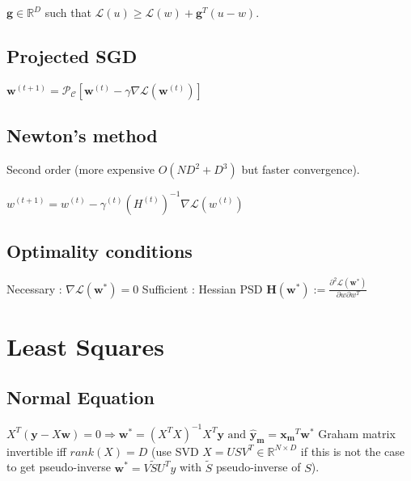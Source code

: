 $\mathbf{g} \in \mathbb{R}^D$ such that $\mathcal{L}(u) \ge \mathcal{L}(w) + \mathbf{g}^T (u-w)$. 


\subsection{Projected SGD}

$\mathbf{w}^{(t+1)} = \mathcal{P_C} [\mathbf{w}^{(t)} - \gamma \nabla \mathcal{L}(\mathbf{w}^{(t)})]$

\subsection{Newton's method}
Second order (more expensive $O(ND^2 + D^3)$ but faster convergence).

$w^{(t+1)} = w^{(t)} - \gamma^{(t)} (H^{(t)})^{-1} \nabla \mathcal{L}(w^{(t)})$


\subsection{Optimality conditions}
Necessary : $\nabla \mathcal{L} (\mathbf{w}^*) = 0$
Sufficient : Hessian PSD $\mathbf{H}(\mathbf{w}^*) := \frac{\partial^2 \mathcal{L}(\mathbf{w}^*)}{\partial w \partial w^T}$


\section{Least Squares}
\subsection{Normal Equation}
$X^T (\mathbf{y} - X\mathbf{w})= 0 \Rightarrow$\newline$\mathbf{w^*} = (X^TX)^{-1}X^T\mathbf{y} \text{ and } \mathbf{\hat{y}_m} = \mathbf{x_m}^T \mathbf{w^*}$
Graham matrix invertible iff $rank(X) = D$ (use SVD $X = USV^T \in \mathbb{R}^{N\times D}$ if this is not the case to get pseudo-inverse $\mathbf{w^*} = V\tilde{S}U^Ty$ with $\tilde{S}$ pseudo-inverse of $S$).

